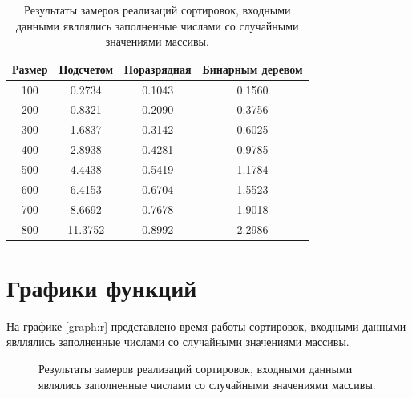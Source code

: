 \newpage

\begin{table}[ht!]
	\begin{center}
			\captionsetup{justification=raggedleft,singlelinecheck=off}
			\caption{Результаты замеров реализаций сортировок, входными данными явллялись заполненные числами со случайными значениями массивы.}
			\label{tbl:random}
			\begin{tabular}{|c|c|c|c|}
				\hline
				Размер & Подсчетом &  Поразрядная &  Бинарным деревом \\
				\hline
				100 & 0.2734 & 0.1043 & 0.1560 \\ 
				\hline
				200 & 0.8321 & 0.2090 & 0.3756 \\ 
				\hline
				300 & 1.6837 & 0.3142 & 0.6025 \\ 
				\hline
				400 & 2.8938 & 0.4281 & 0.9785 \\ 
				\hline
				500 & 4.4438 & 0.5419 & 1.1784 \\ 
				\hline
				600 & 6.4153 & 0.6704 & 1.5523 \\ 
				\hline
				700 & 8.6692 & 0.7678 & 1.9018 \\ 
				\hline
				800 & 11.3752 & 0.8992 & 2.2986 \\ 
				\hline
			\end{tabular}
	\end{center}
\end{table}


\section{Графики функций}

На графике \ref{graph:r} представлено время работы сортировок, входными данными явллялись заполненные числами со случайными значениями массивы.

\begin{figure}[ht!]
	\begin{center}
\end{center}
	\caption{Результаты замеров реализаций сортировок, входными данными являлись заполненные числами со случайными значениями массивы.}
\end{figure}

